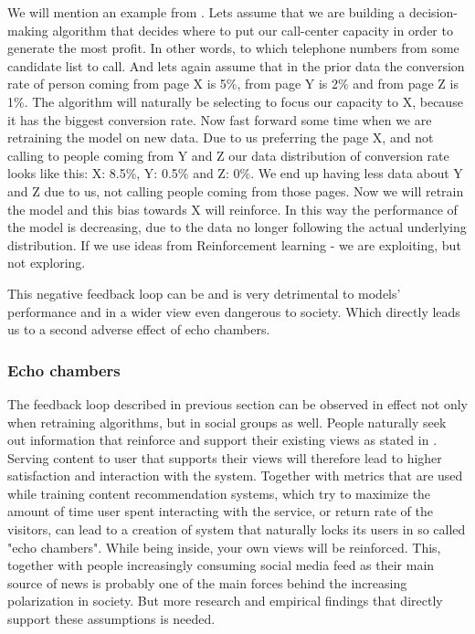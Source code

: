 We will mention an example from \cite{towardsdatascience_negative_feedback_loop}. Lets assume that we are building a decision-making algorithm that decides where to put our call-center capacity in order to generate the most profit. In other words, to which telephone numbers from some candidate list to call. And lets again assume that in the prior data the conversion rate of person coming from page X is 5\%, from page Y is 2\% and from page Z is 1\%. The algorithm will naturally be selecting to focus our capacity to X, because it has the biggest conversion rate. Now fast forward some time when we are retraining the model on new data. Due to us preferring the page X, and not calling to people coming from Y and Z our data distribution of conversion rate looks like this: X: 8.5\%, Y: 0.5\% and Z: 0\%. We end up having less data about Y and Z due to us, not calling people coming from those pages. Now we will retrain the model and this bias towards X will reinforce. In this way the performance of the model is decreasing, due to the data no longer following the actual underlying distribution. If we use ideas from Reinforcement learning - we are exploiting, but not exploring.

This negative feedback loop can be and is very detrimental to models' performance and in a wider view even dangerous to society. Which directly leads us to a second adverse effect of echo chambers.

\subsubsection{Echo chambers}
The feedback loop described in previous section can be observed in effect not only when retraining algorithms, but in social groups as well. People naturally seek out information that reinforce and support their existing views as stated in \cite{garrett2009_reinforcing_opinion}. Serving content to user that supports their views will therefore lead to higher satisfaction and interaction with the system. Together with metrics that are used while training content recommendation systems, which try to maximize the amount of time user spent interacting with the service, or return rate of the visitors, can lead to a creation of system that naturally locks its users in so called "echo chambers". While being inside, your own views will be reinforced. This, together with people increasingly consuming social media feed as their main source of news is probably one of the main forces behind the increasing polarization in society. But more research and empirical findings that directly support these assumptions is needed.









